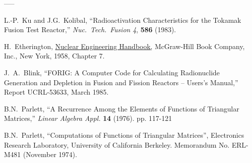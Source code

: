\begin{thebibliography}{100}
  
 -----  
 
 L.-P.~Ku and J.G.~Kolibal, ``Radioactivation
  Characteristics for the Tokamak Fusion Test Reactor,''
  \textsl{Nuc.~Tech.~Fusion 4}, \textbf{586} (1983).
  
 H.~Etherington, \underline{Nuclear Engineering
    Handbook,} McGraw-Hill Book Company, Inc., New York, 1958, Chapter
  7.
  
 J.~A.~Blink, ``FORIG: A Computer Code for
  Calculating Radionuclide Generation and Depletion in Fusion and
  Fission Reactors -- Users's Manual,'' Report UCRL-53633, March 1985.
  
 B.N.~Parlett, ``A Recurrence Among the Elements
  of Functions of Triangular Matrices,'' \textsl{Linear Algebra Appl.}
  \textbf{14} (1976). pp. 117-121
  
 B.N.~Parlett, ``Computations of Functions of
  Triangular Matrices'', Electronics Research Laboratory, University
  of California Berkeley.  Memorandum No. ERL-M481 (November 1974).
  
  
\end{thebibliography}
